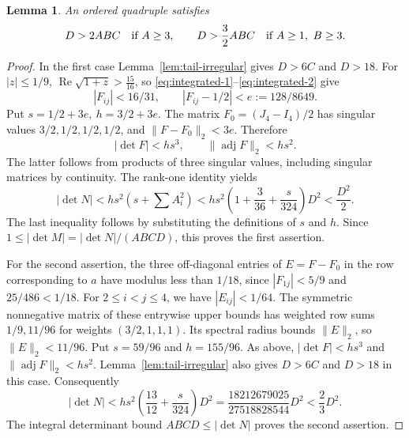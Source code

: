 \documentclass[12pt]{article}
\newtheorem{lemma}[theorem]{Lemma}
\numberwithin{equation}{section}
\begin{document}
\begin{lemma}\label{lem:product-four}
An ordered quadruple satisfies
\[
 D>2ABC\quad\hbox{if }A\ge3,\qquad
 D>\frac32ABC\quad\hbox{if }A\ge1,\ B\ge3.
\]
\end{lemma}
\begin{proof}
In the first case Lemma~\ref{lem:tail-irregular} gives \(D>6C\) and
\(D>18\). For \(|z|\le1/9\),
\(\operatorname{Re}\sqrt{1+z}>\frac{15}{16}\), so \eqref{eq:integrated-1}--\eqref{eq:integrated-2} give
\[
 |F_{ij}|<16/31,\qquad |F_{ij}-1/2|<e:=128/8649.
\]
Put \(s=1/2+3e,\ h=3/2+3e\). The matrix \(F_0=(J_4-I_4)/2\)
has singular values \(3/2,1/2,1/2,1/2\), and
\(\|F-F_0\|_2<3e\). Therefore
\[
 |\det F|<hs^3,\qquad \|\operatorname{adj}F\|_2<hs^2.
\]
The latter follows from products of three singular values, including
singular matrices by continuity. The rank-one identity yields
\[
 |\det N|<hs^2\left(s+\sum A_i^2\right)
 <hs^2\left(1+\frac3{36}+\frac{s}{324}\right)D^2<\frac{D^2}{2}.
\]
The last inequality follows by substituting the definitions of \(s\) and \(h\). Since
\(1\le|\det M|=|\det N|/(ABCD)\), this proves the first assertion.

For the second assertion, the three off-diagonal entries of \(E=F-F_0\)
in the row corresponding to \(a\) have modulus less than \(1/18\),
since \(|F_{1j}|<5/9\) and
\(25/486<1/18\). For \(2\le i<j\le4\), we have \(|E_{ij}|<1/64\).
The symmetric nonnegative matrix of these entrywise upper bounds has
weighted row sums \(1/9,11/96\) for weights \((3/2,1,1,1)\).
Its spectral radius bounds $\|E\|_2$, so $\|E\|_2<11/96$.
Put $s=59/96$ and $h=155/96$. As above,
$|\det F|<hs^3$ and $\|\operatorname{adj}F\|_2<hs^2$.
Lemma~\ref{lem:tail-irregular} also gives $D>6C$ and $D>18$ in this case.
Consequently
\[
 |\det N|<hs^2\left(\frac{13}{12}+\frac{s}{324}\right)D^2
 =\frac{18212679025}{27518828544}D^2<\frac23D^2.
\]
The integral determinant bound $ABCD\le|\det N|$ proves the second assertion.
\end{proof}
\end{document}
